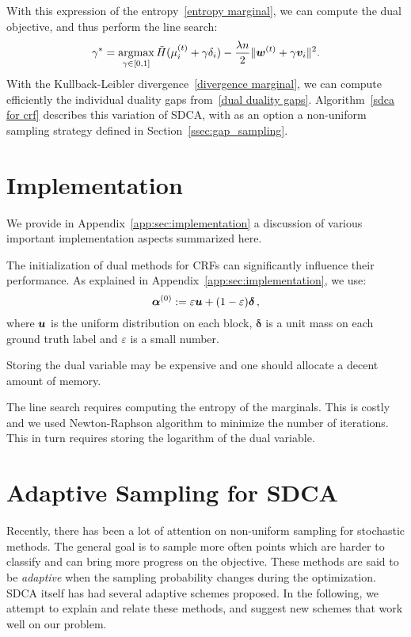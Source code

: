 With this expression of the entropy~\eqref{entropy marginal}, we can compute the dual objective, and thus perform the line search:
\begin{equation}\label{crf line search}
	\gamma^* = \operatorname*{argmax}_{\gamma \in [0,1]} \tilde H(\mu_i^{(t)} + \gamma \delta_i) - \frac{\lambda n}{2} \| \boldsymbol{w}^{(t)} + \gamma \bm v_i \|^2.
\end{equation}
With the Kullback-Leibler divergence~\eqref{divergence marginal}, we can compute efficiently the individual duality gaps from~\eqref{dual duality gaps}.
Algorithm~\ref{sdca for crf} describes this variation of SDCA, with as an option a non-uniform sampling strategy defined in  Section~\ref{ssec:gap_sampling}.

\section{Implementation} \label{sec:implementation}
We provide in Appendix~\ref{app:sec:implementation} a discussion of various important implementation aspects summarized here.
\begin{compactenum}
\item The initialization of dual methods for CRFs can significantly influence their performance. As explained in Appendix~\ref{app:sec:implementation}, we use: 
\begin{equation} \label{eq:initialization}
	\boldsymbol{\alpha}^{(0)} := \varepsilon \bm u + (1-\varepsilon) \bm\delta \, ,
\end{equation}
where $\bm u$ is the uniform distribution on each block, $\bm\delta$ is a unit mass on each ground truth label and $\varepsilon$ is a small number.
\item Storing the dual variable may be expensive and one should allocate a decent amount of memory.
\item The line search requires computing the entropy of the marginals.
This is costly and we used Newton-Raphson algorithm to minimize the number of iterations.
This in turn requires storing the logarithm of the dual variable.
\end{compactenum}
\section{Adaptive Sampling for SDCA} \label{Adaptive Sampling}

Recently, there has been a lot of attention on non-uniform sampling for stochastic methods.
The general goal is to sample more often points which are harder to classify and can bring more progress on the objective.
These methods are said to be \textit{adaptive} when the sampling probability changes during the optimization.
SDCA itself has had several adaptive schemes proposed.
In the following, we attempt to explain and relate these methods, and suggest new schemes that work well on our problem.

